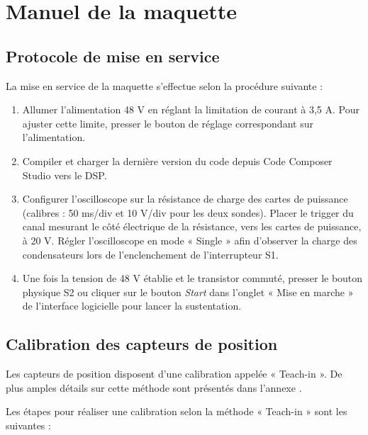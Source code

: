 \chapter{Manuel de la maquette}

\section{Protocole de mise en service}
\label{sec:Protocole}
La mise en service de la maquette s’effectue selon la procédure suivante :
\begin{enumerate}
    \item Allumer l’alimentation 48 V en réglant la limitation de courant à 3,5 A. Pour ajuster cette limite, presser le bouton de réglage correspondant sur l’alimentation.

    \item Compiler et charger la dernière version du code depuis Code Composer Studio vers le DSP.

    \item Configurer l’oscilloscope sur la résistance de charge des cartes de puissance (calibres : 50 ms/div et 10 V/div pour les deux sondes). Placer le trigger du canal mesurant le côté électrique de la résistance, vers les cartes de puissance, à 20 V. Régler l’oscilloscope en mode « Single » afin d’observer la charge des condensateurs lors de l’enclenchement de l’interrupteur S1.

    \item Une fois la tension de 48 V établie et le transistor commuté, presser le bouton physique S2 ou cliquer sur le bouton \textit{Start} dans l’onglet « Mise en marche » de l’interface logicielle pour lancer la sustentation.
\end{enumerate}

\section{Calibration des capteurs de position}
\label{sec:CalibrationCaptPos}
Les capteurs de position disposent d’une calibration appelée « Teach-in ». De plus amples détails sur cette méthode sont présentés dans l’annexe \cite{CaptPosition}.

Les étapes pour réaliser une calibration selon la méthode « Teach-in » sont les suivantes :

